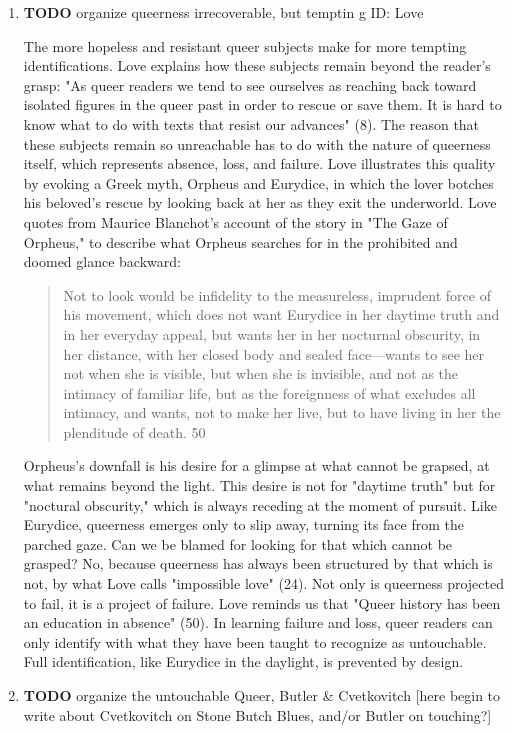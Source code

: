 \documentclass[11pt]{article}
\begin{document}
\begin{enumerate}
\item {\bfseries\sffamily TODO} organize queerness irrecoverable, but temptin g ID: Love
\label{sec:org5c81b15}

The more hopeless and resistant queer subjects make for more tempting
identifications. Love explains how these subjects remain beyond the
reader's grasp: "As queer readers we tend to see ourselves as reaching
back toward isolated figures in the queer past in order to rescue or
save them. It is hard to know what to do with texts that resist our
advances" (8). The reason that these subjects remain so unreachable
has to do with the nature of queerness itself, which represents
absence, loss, and failure. Love illustrates this quality by evoking a
Greek myth, Orpheus and Eurydice, in which the lover botches his
beloved's rescue by looking back at her as they exit the
underworld. Love quotes from Maurice Blanchot's account of the story
in "The Gaze of Orpheus," to describe what Orpheus searches for in the
prohibited and doomed glance backward:

\begin{quote}
Not to look would be infidelity to the measureless, imprudent force
of his movement, which does not want Eurydice in her daytime truth and
in her everyday appeal, but wants her in her nocturnal obscurity, in
her distance, with her closed body and sealed face---wants to see her
not when she is visible, but when she is invisible, and not as the
intimacy of familiar life, but as the foreignness of what excludes all
intimacy, and wants, not to make her live, but to have living in her
the plenditude of death. 50
\end{quote}

Orpheus's downfall is his desire for a glimpse at what cannot be
grapsed, at what remains beyond the light. This desire is not for
"daytime truth" but for "noctural obscurity," which is always receding
at the moment of pursuit. Like Eurydice, queerness emerges only to
slip away, turning its face from the parched gaze. Can we be blamed
for looking for that which cannot be grasped? No, because queerness
has always been structured by that which is not, by what Love calls
"impossible love" (24). Not only is queerness projected to fail, it is
a project of failure. Love reminds us that "Queer history has been an
education in absence" (50). In learning failure and loss, queer
readers can only identify with what they have been taught to recognize
as untouchable. Full identification, like Eurydice in the daylight, is
prevented by design.

\item {\bfseries\sffamily TODO} organize the untouchable Queer, Butler \& Cvetkovitch
\label{sec:org1e2f38f}
[here begin to write about Cvetkovitch on Stone Butch Blues, and/or
Butler on touching?]
\end{enumerate}
\end{document}
